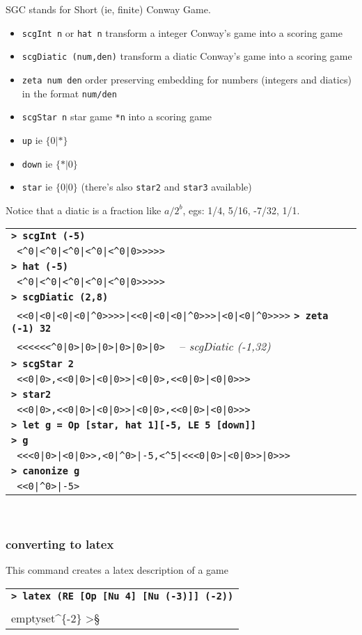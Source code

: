 \documentclass[a4paper,12pt]{article}
\newcommand{\bash}[1]{\small\textbf{\lstinline§> #1§}\\}
\newcommand{\out}[1]{\small\lstinline§ #1§}
\newcommand{\hsklcmt}[1]{~~-- \footnotesize\textit{#1}}
\newcommand{\haskellCode}{\fontfamily{pcr}\selectfont}
\newenvironment{sgcode}
	{ \haskellCode
	  \begin{tabular}{|p{0.9\textwidth}|}
      \hline	
	}
	{ \\\hline  
      \end{tabular} \\
	  \par 
	}
\begin{document}
SGC stands for Short (ie, finite) Conway Game.

\begin{itemize} \setlength\itemsep{0.1em}
  \item \verb|scgInt n| or \verb|hat n| transform a integer Conway's game into a scoring game
  \item \verb|scgDiatic (num,den)| transform a diatic Conway's game into a scoring game
  \item \verb|zeta num den| order preserving embedding for numbers (integers and diatics) in the format \verb|num/den|
  \item \verb|scgStar n| star game \verb|*n| into a scoring game
  \item \verb|up| ie $\{0|*\}$
  \item \verb|down| ie $\{*|0\}$
  \item \verb|star| ie $\{0|0\}$ (there's also \verb|star2| and \verb|star3| available)
\end{itemize}

Notice that a diatic is a fraction like $a/2^b$, egs: 1/4, 5/16, -7/32, 1/1.

\begin{sgcode}
\bash{scgInt (-5)}
\out{<^0|<^0|<^0|<^0|<^0|0>>>>>} \\
\bash{hat (-5)}
\out{<^0|<^0|<^0|<^0|<^0|0>>>>>} \\
\bash{scgDiatic (2,8)}
\out{<<0|<0|<0|<0|^0>>>>|<<0|<0|<0|^0>>>|<0|<0|^0>>>>}
\bash{zeta (-1) 32}
\out{<<<<<<^0|0>|0>|0>|0>|0>|0>} \hsklcmt{scgDiatic (-1,32)} \\
\bash{scgStar 2}
\out{<<0|0>,<<0|0>|<0|0>>|<0|0>,<<0|0>|<0|0>>>} \\
\bash{star2}
\out{<<0|0>,<<0|0>|<0|0>>|<0|0>,<<0|0>|<0|0>>>} \\
\bash{let g = Op [star, hat 1][-5, LE 5 [down]]}
\bash{g}
\out{<<<0|0>|<0|0>>,<0|^0>|-5,<^5|<<<0|0>|<0|0>>|0>>>} \\
\bash{canonize g}
\out{<<0|^0>|-5>}
\end{sgcode}

\subsubsection{converting to latex}

This command creates a latex description of a game

\begin{sgcode}
\bash{latex (RE [Op [Nu 4] [Nu (-3)]] (-2))}
\out{ <<4|-3>|\\emptyset^\{-2\} >}
\end{sgcode}
\end{document}
